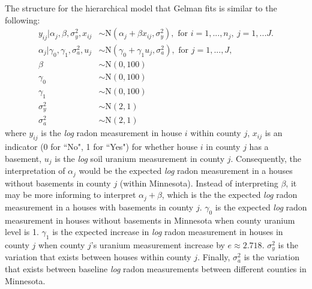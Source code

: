 \documentclass{article}
\begin{document}
\noindent
The structure for the hierarchical model that Gelman fits is similar to the
following:
\begin{align*}
  y_{ij}|\alpha_j,\beta,\sigma_y^2,x_{ij} &\sim \text{N}(\alpha_j + \beta
      x_{ij},\sigma_y^2),\text{ for }i=1,...,n_j,~j=1,...J.\\
  \alpha_{j}|\gamma_0,\gamma_1,\sigma_a^2,u_j &\sim \text{N}(\gamma_0 +
      \gamma_1 u_j,\sigma_a^2),\text{ for }j=1,...,J,\\
  \beta &\sim \text{N}(0,100) \\
  \gamma_0 &\sim \text{N}(0,100)\\
  \gamma_1 &\sim \text{N}(0,100)\\
  \sigma_y^2 &\sim \text{N}(2,1)\\
  \sigma_a^2 &\sim \text{N}(2,1)
\end{align*}
where $y_{ij}$ is the \textit{log} radon measurement in house $i$ within county
$j$, $x_{ij}$ is an indicator (0 for ``No", 1 for ``Yes") for whether house $i$
in county $j$ has a basement, $u_j$ is the \textit{log} soil uranium
measurement in county $j$. Consequently, the interpretation of $\alpha_j$ would
be the expected \textit{log} radon measurement in a houses without basements in
county $j$ (within Minnesota). Instead of interpreting $\beta$, it may be more
informing to interpret $\alpha_j+\beta$, which is the the expected \textit{log}
radon measurement in a houses with basements in county $j$. $\gamma_0$ is the
expected \textit{log} radon measurement in houses without basements in
Minnesota when county uranium level is 1. $\gamma_1$ is the expected increase
in \textit{log} radon measurement in houses in county $j$ when county $j$'s
uranium measurement increase by $e\approx 2.718$. $\sigma_y^2$ is the variation
that exists between houses within county $j$. Finally, $\sigma_a^2$ is the
variation that exists between baseline \textit{log} radon measurements between
different counties in Minnesota.\\
\end{document}
